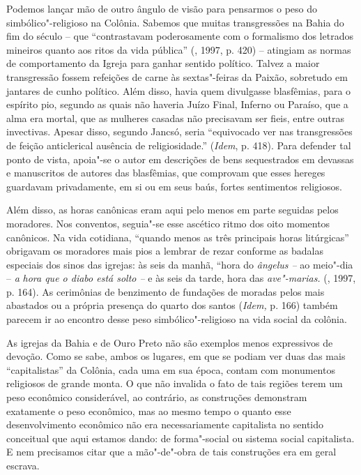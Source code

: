 {Podemos lançar mão de outro ângulo de visão para pensarmos o peso do
simbólico"-religioso na Colônia. Sabemos que muitas transgressões na
Bahia do fim do século  -- que ``contrastavam poderosamente com o
formalismo dos letrados mineiros quanto aos ritos da vida pública''
(, 1997, p. 420) -- atingiam as normas de comportamento da Igreja
para ganhar sentido político. Talvez a maior transgressão fossem
refeições de carne às sextas"-feiras da Paixão, sobretudo em jantares de
cunho político. Além disso, havia quem divulgasse blasfêmias, para o
espírito pio, segundo as quais não haveria Juízo Final, Inferno ou
Paraíso, que a alma era mortal, que as mulheres casadas não precisavam
ser fieis, entre outras invectivas. Apesar disso, segundo Jancsó, seria
``equivocado ver nas transgressões de feição anticlerical ausência de
religiosidade.'' (\emph{Idem}, p. 418). Para defender tal ponto de
vista, apoia"-se o autor em descrições de bens sequestrados em devassas e
manuscritos de autores das blasfêmias, que comprovam que esses hereges
guardavam privadamente, em si ou em seus baús, fortes sentimentos
religiosos.

Além disso, as horas canônicas eram aqui pelo menos em parte seguidas
pelos moradores. Nos conventos, seguia"-se esse ascético ritmo dos oito
momentos canônicos. Na vida cotidiana, ``quando menos as três principais
horas litúrgicas'' obrigavam os moradores mais pios a lembrar de rezar
conforme as badalas especiais dos sinos das igrejas: às seis da manhã,
``hora do \emph{ângelus --} ao meio"-dia -- \emph{a} \emph{hora que o
diabo está solto --} e às seis da tarde, hora das \emph{ave"-marias.}
(, 1997, p. 164). As cerimônias de benzimento de fundações de
moradas pelos mais abastados ou a própria presença do quarto dos santos
(\emph{Idem,} p. 166) também parecem ir ao encontro desse peso
simbólico"-religioso na vida social da colônia.

As igrejas da Bahia e de Ouro Preto não são exemplos menos expressivos
de devoção. Como se sabe, ambos os lugares, em que se podiam ver duas
das mais ``capitalistas'' da Colônia, cada uma em sua época, contam com
monumentos religiosos de grande monta. O que não invalida o fato de tais
regiões terem um peso econômico considerável, ao contrário, as
construções demonstram exatamente o peso econômico, mas ao mesmo tempo o
quanto esse desenvolvimento econômico não era necessariamente
capitalista no sentido conceitual que aqui estamos dando: de
forma"-social ou sistema social capitalista. E nem precisamos citar que a
mão"-de"-obra de tais construções era em geral escrava.

}
